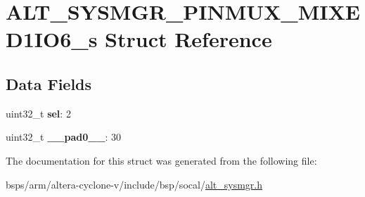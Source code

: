 \hypertarget{structALT__SYSMGR__PINMUX__MIXED1IO6__s}{}\section{A\+L\+T\+\_\+\+S\+Y\+S\+M\+G\+R\+\_\+\+P\+I\+N\+M\+U\+X\+\_\+\+M\+I\+X\+E\+D1\+I\+O6\+\_\+s Struct Reference}
\label{structALT__SYSMGR__PINMUX__MIXED1IO6__s}
\subsection*{Data Fields}
\begin{DoxyCompactItemize}
\item 
\mbox{\label{structALT__SYSMGR__PINMUX__MIXED1IO6__s_a070bb955704a32aab9ed636923e7ca73}} 
uint32\+\_\+t {\bfseries sel}\+: 2
\item 
\mbox{\label{structALT__SYSMGR__PINMUX__MIXED1IO6__s_a1423f7d2b1add911d01197fd60ee9a7a}} 
uint32\+\_\+t {\bfseries \+\_\+\+\_\+pad0\+\_\+\+\_\+}\+: 30
\end{DoxyCompactItemize}


The documentation for this struct was generated from the following file\+:\begin{DoxyCompactItemize}
\item 
bsps/arm/altera-\/cyclone-\/v/include/bsp/socal/\mbox{\hyperlink{alt__sysmgr_8h}{alt\+\_\+sysmgr.\+h}}\end{DoxyCompactItemize}
